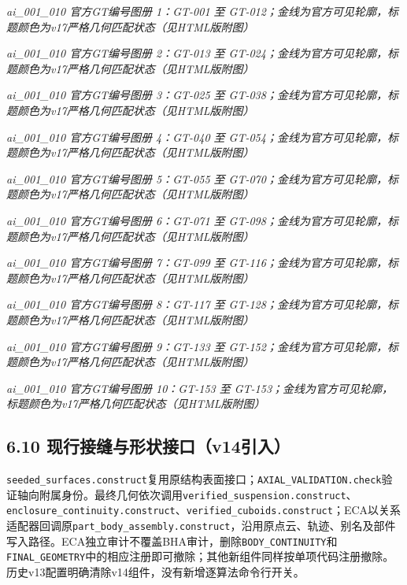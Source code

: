 \documentclass[UTF8,fontset=fandol]{ctexart}
\begin{document}
\textit{ai\_001\_010 官方GT编号图册 1：GT-001 至 GT-012；金线为官方可见轮廓，标题颜色为v17严格几何匹配状态（见HTML版附图）}



\textit{ai\_001\_010 官方GT编号图册 2：GT-013 至 GT-024；金线为官方可见轮廓，标题颜色为v17严格几何匹配状态（见HTML版附图）}



\textit{ai\_001\_010 官方GT编号图册 3：GT-025 至 GT-038；金线为官方可见轮廓，标题颜色为v17严格几何匹配状态（见HTML版附图）}



\textit{ai\_001\_010 官方GT编号图册 4：GT-040 至 GT-054；金线为官方可见轮廓，标题颜色为v17严格几何匹配状态（见HTML版附图）}



\textit{ai\_001\_010 官方GT编号图册 5：GT-055 至 GT-070；金线为官方可见轮廓，标题颜色为v17严格几何匹配状态（见HTML版附图）}



\textit{ai\_001\_010 官方GT编号图册 6：GT-071 至 GT-098；金线为官方可见轮廓，标题颜色为v17严格几何匹配状态（见HTML版附图）}



\textit{ai\_001\_010 官方GT编号图册 7：GT-099 至 GT-116；金线为官方可见轮廓，标题颜色为v17严格几何匹配状态（见HTML版附图）}



\textit{ai\_001\_010 官方GT编号图册 8：GT-117 至 GT-128；金线为官方可见轮廓，标题颜色为v17严格几何匹配状态（见HTML版附图）}



\textit{ai\_001\_010 官方GT编号图册 9：GT-133 至 GT-152；金线为官方可见轮廓，标题颜色为v17严格几何匹配状态（见HTML版附图）}



\textit{ai\_001\_010 官方GT编号图册 10：GT-153 至 GT-153；金线为官方可见轮廓，标题颜色为v17严格几何匹配状态（见HTML版附图）}



\subsection*{6.10 现行接缝与形状接口（v14引入）}

\texttt{seeded\_\allowbreak{}surfaces.\allowbreak{}construct}复用原结构表面接口；\texttt{AXIAL\_\allowbreak{}VALIDATION.\allowbreak{}check}验证轴向附属身份。最终几何依次调用\texttt{verified\_\allowbreak{}suspension.\allowbreak{}construct}、\texttt{enclosure\_\allowbreak{}continuity.\allowbreak{}construct}、\texttt{verified\_\allowbreak{}cuboids.\allowbreak{}construct}；ECA以关系适配器回调原\texttt{part\_\allowbreak{}body\_\allowbreak{}assembly.\allowbreak{}construct}，沿用原点云、轨迹、别名及部件写入路径。ECA独立审计不覆盖BHA审计，删除\texttt{BODY\_\allowbreak{}CONTINUITY}和\texttt{FINAL\_\allowbreak{}GEOMETRY}中的相应注册即可撤除；其他新组件同样按单项代码注册撤除。历史v13配置明确清除v14组件，没有新增逐算法命令行开关。
\end{document}
